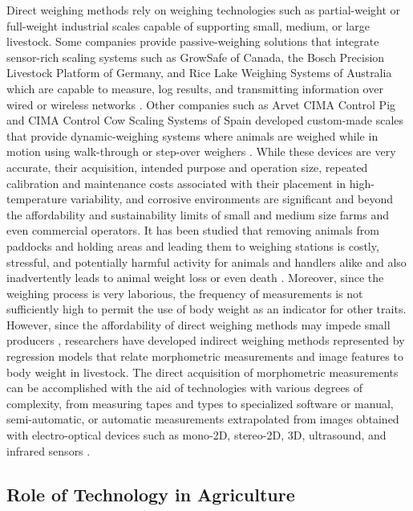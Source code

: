{Direct weighing methods rely on weighing technologies such as partial-weight or full-weight industrial scales capable of supporting small, medium, or large livestock. Some companies provide passive-weighing solutions that integrate sensor-rich scaling systems such as GrowSafe of Canada, the Bosch Precision Livestock Platform of Germany, and Rice Lake Weighing Systems of Australia which are capable to measure, log results, and transmitting information over wired or wireless networks \citep{wang2024review} . Other companies such as Arvet CIMA Control Pig and CIMA Control Cow Scaling Systems of Spain developed custom-made scales that provide dynamic-weighing systems where animals are weighed while in motion using walk-through or step-over weighers \citep{rousing2004stepping}. While these devices are very accurate, their acquisition, intended purpose and operation size, repeated calibration and maintenance costs associated with their placement in high-temperature variability, and corrosive environments are significant and beyond the affordability and sustainability limits of small and medium size farms and even commercial operators\citep{dikmen2012effect}. It has been studied that removing animals from paddocks and holding areas and leading them to weighing stations is costly, stressful, and potentially harmful activity for animals and handlers alike and also inadvertently leads to animal weight loss or even death \citep{faucitano2018transport}. Moreover, since the weighing process is very laborious, the frequency of measurements is not sufficiently high to permit the use of body weight as an indicator for other traits. However, since the affordability of direct weighing methods may impede small producers \citep{dickinson2013automated}, researchers have developed indirect weighing methods represented by regression models that relate morphometric measurements and image features to body weight in livestock. The direct acquisition of morphometric measurements can be accomplished with the aid of technologies with various degrees of complexity, from measuring tapes and types to specialized software or manual, semi-automatic, or automatic measurements extrapolated from images obtained with electro-optical devices such as mono-2D, stereo-2D, 3D, ultrasound, and infrared sensors \citep{wang2024review}.

\subsection{Role of Technology in Agriculture}

}
